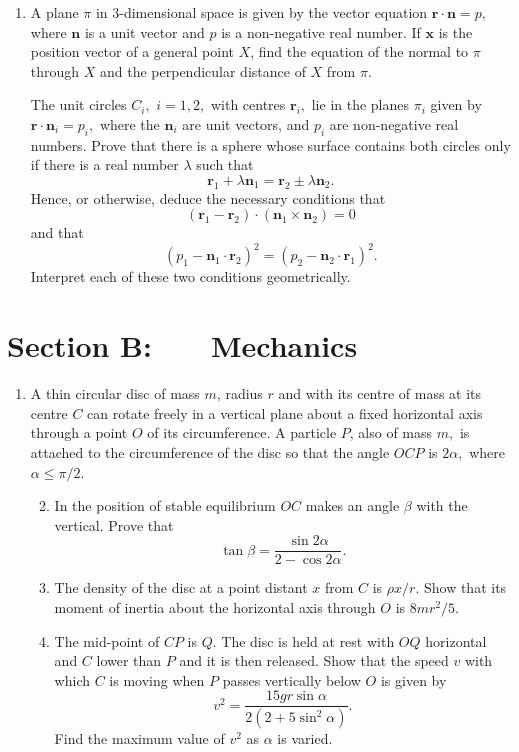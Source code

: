 \documentclass[a4, 11pt]{report}
\newlength{\qspace}
\newcounter{qnumber}
\newenvironment{question}%
 {\vspace{\qspace}
  \begin{enumerate}[\bfseries 1\quad][10]%
    \setcounter{enumi}{\value{qnumber}}%
    \item%
 }
{
  \end{enumerate}
  \filbreak
  \stepcounter{qnumber}
 }
\newenvironment{questionparts}[1][1]%
 {
  \begin{enumerate}[\bfseries (i)]%
    \setcounter{enumii}{#1}
    \addtocounter{enumii}{-1}
    \setlength{\itemsep}{5mm}
    \setlength{\parskip}{8pt}
 }
 {
  \end{enumerate}
 }
\begin{document}
\begin{question}	
A plane $\pi$ in 3-dimensional space is given by the vector equation
$\mathbf{r}\cdot\mathbf{n}=p,$ where $\mathbf{n}$ is a unit vector
and $p$ is a non-negative real number. If $\mathbf{x}$ is the position
vector of a general point $X$, find the equation of the normal to
$\pi$ through $X$ and the perpendicular distance of $X$ from $\pi$. 


The unit circles $C_{i},$ $i=1,2,$ with centres $\mathbf{r}_{i},$
lie in the planes $\pi_{i}$ given by $\mathbf{r}\cdot\mathbf{n}_{i}=p_{i},$
where the $\mathbf{n}_{i}$ are unit vectors, and $p_{i}$ are non-negative
real numbers. Prove that there is a sphere whose surface contains
both circles only if there is a real number $\lambda$ such that 
\[
\mathbf{r}_{1}+\lambda\mathbf{n}_{1}=\mathbf{r}_{2}\pm\lambda\mathbf{n}_{2}.
\]
Hence, or otherwise, deduce the necessary conditions that 
\[
(\mathbf{r}_{1}-\mathbf{r}_{2})\cdot(\mathbf{n}_{1}\times\mathbf{n}_{2})=0
\]
and that 
\[
(p_{1}-\mathbf{n}_{1}\cdot\mathbf{r}_{2})^{2}=(p_{2}-\mathbf{n}_{2}\cdot\mathbf{r}_{1})^{2}.
\]
Interpret each of these two conditions geometrically. 
\end{question}	
		

		
	
\newpage
\section*{Section B: \ \ \ Mechanics}


	
\begin{question}
 A thin circular disc of mass $m$, radius $r$ and with its centre
of mass at its centre $C$ can rotate freely in a vertical plane about
a fixed horizontal axis through a point $O$ of its circumference.
A particle $P$, also of mass $m,$ is attached to the circumference
of the disc so that the angle $OCP$ is $2\alpha,$ where $\alpha\leqslant\pi/2$. 

\begin{questionparts}
\item In the position of stable equilibrium $OC$ makes an angle $\beta$
with the vertical. Prove that 
\[
\tan\beta=\frac{\sin2\alpha}{2-\cos2\alpha}.
\]

\item The density of the disc at a point distant $x$ from $C$ is $\rho x/r.$
Show that its moment of inertia about the horizontal axis through
$O$ is $8mr^{2}/5$. 
\item The mid-point of $CP$ is $Q$. The disc is held at rest with $OQ$
horizontal and $C$ lower than $P$ and it is then released. Show
that the speed $v$ with which $C$ is moving when $P$ passes vertically
below $O$ is given by 
\[
v^{2}=\frac{15gr\sin\alpha}{2(2+5\sin^{2}\alpha)}.
\]
Find the maximum value of $v^{2}$ as $\alpha$ is varied. 
\end{questionparts}
	\end{question}
	
\end{document}
